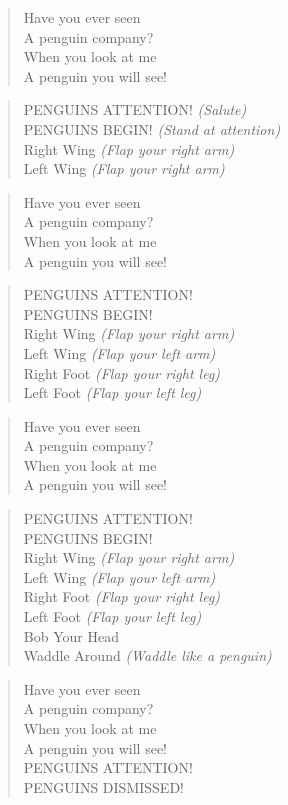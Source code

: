 
\begin{verse}
Have you ever seen \\
A penguin company? \\
When you look at me \\
A penguin you will see! \\
\end{verse}

\begin{verse}
PENGUINS ATTENTION! \textit{(Salute)} \\
PENGUINS BEGIN! \textit{(Stand at attention)} \\
Right Wing \textit{(Flap your right arm)} \\
Left Wing \textit{(Flap your right arm)} \\
\end{verse}

\begin{verse}
Have you ever seen \\
A penguin company? \\
When you look at me \\
A penguin you will see! \\
\end{verse}

\begin{verse}
PENGUINS ATTENTION! \\
PENGUINS BEGIN! \\
Right Wing \textit{(Flap your right arm)} \\
Left Wing \textit{(Flap your left arm)} \\
Right Foot \textit{(Flap your right leg)} \\
Left Foot \textit{(Flap your left leg)} \\
\end{verse}

\begin{verse}
Have you ever seen \\
A penguin company? \\
When you look at me \\
A penguin you will see! \\
\end{verse}

\begin{verse}
PENGUINS ATTENTION! \\
PENGUINS BEGIN! \\
Right Wing \textit{(Flap your right arm)} \\
Left Wing \textit{(Flap your left arm)} \\
Right Foot \textit{(Flap your right leg)} \\
Left Foot \textit{(Flap your left leg)} \\
Bob Your Head \\
Waddle Around \textit{(Waddle like a penguin)} \\
\end{verse}

\begin{verse}
Have you ever seen \\
A penguin company? \\
When you look at me \\
A penguin you will see! \\
PENGUINS ATTENTION! \\
PENGUINS DISMISSED! \\
\end{verse}
